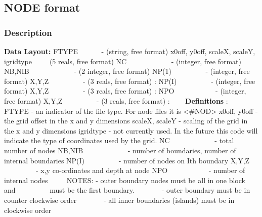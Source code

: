 \documentclass{article}
\begin{document}
\subsection[NODE format]{NODE format}
\subsubsection[Description]{Description}
\textbf{Data Layout:}\newline
FTYPE \ \ \ \ \ \  {}- (string, free format) \newline
x0off, y0off, scaleX, scaleY, igridtype\ \ \ \ \ (5 reals, free format)\newline
NC \ \ \ \ \ \ \ \ \ \ \ \ {}- (integer, free format)\newline
NB,NIB \ \ \ \ \ \ \ \ \ \ \ \ {}- (2 integer, free format)\newline
NP(1) \ \ \ \ \ \ \ \ \ {}- (integer, free format)\newline
X,Y,Z \ \ \ \ \ \ \ \ \ {}- (3 reals, free format)\newline
:\newline
NP(I) \ \ \ \ \ \ \ \ \ {}- (integer, free format)\newline
X,Y,Z \ \ \ \ \ \ \ \ \ {}- (3 reals, free format)\newline
:\newline
NPO \ \ \ \ \ \ \ \ \ \ \ {}- (integer, free format)\newline
X,Y,Z \ \ \ \ \ \ \ \ \ {}- (3 reals, free format)\newline
:\newline
 \ \ \ \newline
\textbf{Definitions} :\newline
 \ \newline
FTYPE - an indicator of the file type.  For node files it is <\#NOD> \newline
x0off, y0off - the grid offset in the x and y dimensions \newline
scaleX, scaleY - scaling of the grid in the x and y dimensions \newline
igridtype - not currently used.  In the future this code will indicate the type of coordinates used by the grid. \newline
NC \ \ \ \ \ \ \ \ \ \ \ \ {}- total number of nodes\newline
NB,NIB \ \ \ \ \ \ \ \ \ \ \ \ {}- number of boundaries, number of internal boundaries\newline
NP(I) \ \ \ \ \ \ \ \ \ {}- number of nodes on Ith boundary\newline
X,Y,Z \ \ \ \ \ \ \ \ \ {}- x,y co-ordinates and depth at node\newline
NPO \ \ \ \ \ \ \ \ \ \ \ {}- number of internal nodes\newline
 \ \ \ \ \newline
 NOTES: - outer boundary nodes must be all in one block and\newline
 \ \ \ \ \ \ \ \ \ must be the first boundary.\newline
 \ \ \ \ \ \ \ {}- outer boundary must be in counter clockwise order\newline
 \ \ \ \ \ \ \ {}- all inner boundaries (islands) must be in clockwise order
\end{document}
